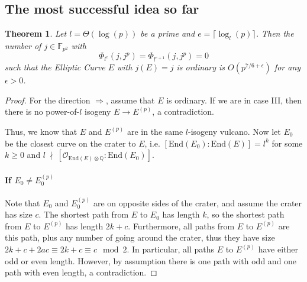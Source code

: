 \documentclass{scrartcl}
\newcommand{\F}{\mathbb{F}}
\newcommand{\End}{\mathrm{End}}
\newcommand{\notdivides}{\ \nmid \ }
\renewcommand{\O}{\mathcal{O}}
\newtheorem{theorem}[prop]{Theorem}
\theoremstyle{definition}
\begin{document}
\subsection*{The most successful idea so far}
\begin{theorem}
    Let $l = \Theta(\log(p))$ be a prime and $e = \lceil \log_l(p) \rceil$.
    Then the number of $j \in \F_{p^2}$ with
    \begin{equation*}
        \Phi_{l^e}(j, j^p) = \Phi_{l^{e + 1}}(j, j^p) = 0
    \end{equation*}
    such that the Elliptic Curve $E$ with $j(E) = j$ is ordinary is $O(p^{7/6 + \epsilon})$ for any $\epsilon > 0$.
\end{theorem}
\begin{proof}
    For the direction $\Rightarrow$, assume that $E$ is ordinary.
    If we are in case III, then there is no power-of-$l$ isogeny $E \to E^{(p)}$, a contradiction.

    Thus, we know that $E$ and $E^{(p)}$ are in the same $l$-isogeny vulcano.
    Now let $E_0$ be the closest curve on the crater to $E$, i.e. $[\End(E_0) : \End(E)] = l^k$ for some $k \geq 0$ and $l \notdivides [\O_{\End(E) \otimes \mathbb{Q}} : \End(E_0)]$.
    
    \paragraph*{If $E_0 \neq E_0^{(p)}$} Note that $E_0$ and $E_0^{(p)}$ are on opposite sides of the crater, and assume the crater has size $c$.
    The shortest path from $E$ to $E_0$ has length $k$, so the shortest path from $E$ to $E^{(p)}$ has length $2k + c$.
    Furthermore, all paths from $E$ to $E^{(p)}$ are this path, plus any number of going around the crater, thus they have size $2k + c + 2ac \equiv 2k + c \equiv c \mod 2$.
    In particular, all paths $E$ to $E^{(p)}$ have either odd or even length.
    However, by assumption there is one path with odd and one path with even length, a contradiction.


\end{proof}
\end{document}
